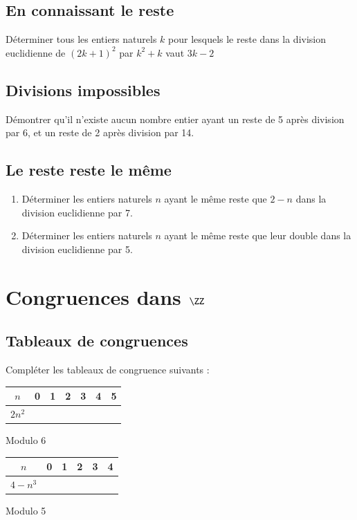 \documentclass[oneside,12pt]{article}          %
\begin{document}
\subsection{En connaissant le reste}
Déterminer tous les entiers naturels $k$ pour lesquels le reste dans la division euclidienne de $(2k+1)^2$ par $k^2+k$ vaut $3k-2$



\subsection{Divisions impossibles}
Démontrer qu'il n'existe aucun nombre entier ayant un reste de 5 après division par 6, et un reste de 2 après division par 14.



\subsection{Le reste reste le même}
\begin{enumerate}
	\item Déterminer les entiers naturels $n$ ayant le même reste que $2-n$ dans la division euclidienne par 7.
	\item Déterminer les entiers naturels $n$ ayant le même reste que leur double dans la division euclidienne par 5.
\end{enumerate}


\section{Congruences dans $\ZZ$}

\subsection{Tableaux de congruences}
Compléter les tableaux de congruence suivants :
    
    \begin{minipage}{0.5\textwidth}
    \setlength{\tabcolsep}{15pt}
        \begin{tabular}{|c|c|c|c|c|c|c|} \hline
        $n$&0&1&2&3&4&5 \\ \hline
        $2n^2$& & & & & & \\ \hline
      \end{tabular}
      
      \smallskip
      \centering \small Modulo 6
    \end{minipage}
    \begin{minipage}{0.5\textwidth}
    \setlength{\tabcolsep}{15pt}
        \begin{tabular}{|c|c|c|c|c|c|} \hline
        $n$&0&1&2&3&4 \\ \hline
        $4-n^3$& & & & & \\ \hline
      \end{tabular}
      
      \smallskip
      \centering \small Modulo 5
    \end{minipage}\\[15pt]
\end{document}
